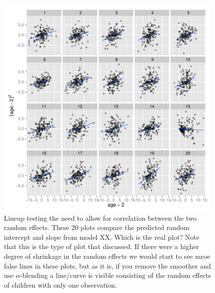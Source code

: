 \documentclass{article} %
\begin{document}
%

\begin{figure}
	\centering
	\includegraphics[width=\textwidth]{ranef3_lineup15.pdf}
	\caption{\label{fig:lineup-ranef3} Lineup testing the need to allow for correlation between the two random effects. These 20 plots compare the predicted random intercept and slope from model XX. Which is the real plot? Note that this is the type of plot that \cite{Morrell:2000ve} discussed. If there were a higher degree of shrinkage in the random effects we would start to see mroe false lines in these plots, but as it is, if you remove the smoother and use $\alpha$-blending a line/curve is visible consisting of the random effects of children with only one observation.}
\end{figure}
\end{document}
